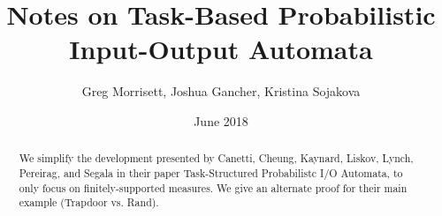 \documentclass[10pt]{article}
\begin{document}
 
\author{Greg Morrisett, Joshua Gancher, Kristina Sojakova}
\title{{\bf Notes on Task-Based Probabilistic Input-Output Automata}}
\date{June 2018}

\maketitle

\newcommand{\C}{\mathcal{C}}
\newcommand{\X}{\mathcal{X}}
\newcommand{\Y}{\mathcal{Y}}
\newcommand{\Z}{\mathcal{Z}}
\newcommand{\F}{\mathcal{F}}
\newcommand{\G}{\mathcal{G}}
\newcommand{\E}{\mathcal{E}}
\newcommand{\D}{\mathcal{D}}
\newcommand{\U}{\mathbb{U}}
\newcommand{\M}{\mathcal{M}}
\newcommand{\I}{\mathcal{I}}
\newcommand{\rat}{\mathbb{R}^{\geq 0}}
\newcommand{\supp}{\mathsf{supp}}
\newcommand{\trace}{\mathsf{trace}}
\newcommand{\state}{\mathsf{state}}
\newcommand{\apply}{\mathsf{apply}}
\newcommand{\pair}{\mathsf{pair}}
\newcommand{\Rand}{\mathsf{Rand}}
\newcommand{\Trap}{\mathsf{Trap}}
\newcommand{\report}{\mathsf{report}}
\newcommand{\chse}{\mathsf{choose}}
\newcommand{\compute}{\mathsf{compute}}
\newcommand{\Report}{\mathsf{Report}}
\newcommand{\Chse}{\mathsf{Choose}}
\newcommand{\Compute}{\mathsf{Compute}}
\newcommand{\RPSIdeal}{\mathsf{Ideal}_\mathsf{RPS}}
\newcommand{\RPSReal}{\mathsf{Real}_\mathsf{RPS}}
\newcommand{\rock}{\mathsf{r}}
\newcommand{\paper}{\mathsf{p}}
\newcommand{\scissors}{\mathsf{s}}
\newcommand{\Committed}{\mathsf{Committed}}
\newcommand{\Reveal}{\mathsf{Reveal}}
\newcommand{\committed}{\mathsf{committed}}
\newcommand{\reveal}{\mathsf{reveal}}
\newcommand{\Commit}{\mathsf{Commit}}
\newcommand{\Open}{\mathsf{Open}}
\newcommand{\Winner}{\mathsf{Winner}}
\newcommand{\commit}{\mathsf{commit}}
\newcommand{\open}{\mathsf{open}}
\newcommand{\winner}{\mathsf{winner}}

\newtheorem{theorem}{Theorem}						
\newtheorem{definition}[theorem]{Definition}
\newtheorem{proposition}[theorem]{Proposition}
\newtheorem{lemma}[theorem]{Lemma}
\newtheorem{remark}[theorem]{Remark}
\newtheorem{example}[theorem]{Example}
\newtheorem{notation}[theorem]{Notation}
\newtheorem{corollary}[theorem]{Corollary}



\begin{abstract}
We simplify the development presented by Canetti, Cheung, Kaynard, Liskov, Lynch, Pereirag, and Segala in their paper Task-Structured Probabilistc I/O Automata, to only focus on finitely-supported measures. We give an alternate proof for their main example (Trapdoor vs. Rand).  
\end{abstract}
\end{document}
